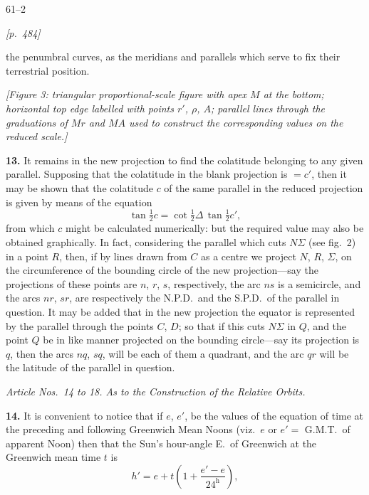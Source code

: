 \documentclass[11pt]{article}
\begin{document}
\medskip

\hfill 61--2

\medskip

\noindent\textit{[p.~484]}

\medskip

the penumbral curves, as the meridians and parallels which serve to fix
their terrestrial position.

\medskip

\begin{center}
\textit{[Figure 3: triangular proportional-scale figure with apex $M$ at
the bottom; horizontal top edge labelled with points $r'$, $\rho$, $A$;
parallel lines through the graduations of $Mr$ and $MA$ used to construct
the corresponding values on the reduced scale.]}
\end{center}

\smallskip

\textbf{13.} It remains in the new projection to find the colatitude
belonging to any given parallel. Supposing that the colatitude in the
blank projection is $=c'$, then it may be shown that the colatitude $c$ of
the same parallel in the reduced projection is given by means of the
equation
\[
\tan\tfrac{1}{2}c = \cot\tfrac{1}{2}\Delta\,\tan\tfrac{1}{2}c',
\]
from which $c$ might be calculated numerically: but the required value
may also be obtained graphically. In fact, considering the parallel which
cuts $N\Sigma$ (see fig.~2) in a point $R$, then, if by lines drawn from
$C$ as a centre we project $N$, $R$, $\Sigma$, on the circumference of
the bounding circle of the new projection---say the projections of these
points are $n$, $r$, $s$, respectively, the arc $ns$ is a semicircle, and
the arcs $nr$, $sr$, are respectively the N.P.D.\ and the S.P.D.\ of the
parallel in question. It may be added that in the new projection the
equator is represented by the parallel through the points $C$, $D$; so
that if this cuts $N\Sigma$ in $Q$, and the point $Q$ be in like manner
projected on the bounding circle---say its projection is $q$, then the
arcs $nq$, $sq$, will be each of them a quadrant, and the arc $qr$ will
be the latitude of the parallel in question.

\medskip

\begin{center}
\textit{Article Nos.\ 14 to 18. As to the Construction of the Relative Orbits.}
\end{center}

\medskip

\textbf{14.} It is convenient to notice that if $e$, $e'$, be the values
of the equation of time at the preceding and following Greenwich Mean
Noons (viz.\ $e$ or $e' = $ G.M.T.\ of apparent Noon) then that the Sun's
hour-angle E.\ of Greenwich at the Greenwich mean time $t$ is
\[
h' = e + t\!\left(1 + \frac{e'-e}{24^{\mathrm{h}}}\right),
\]
\end{document}
